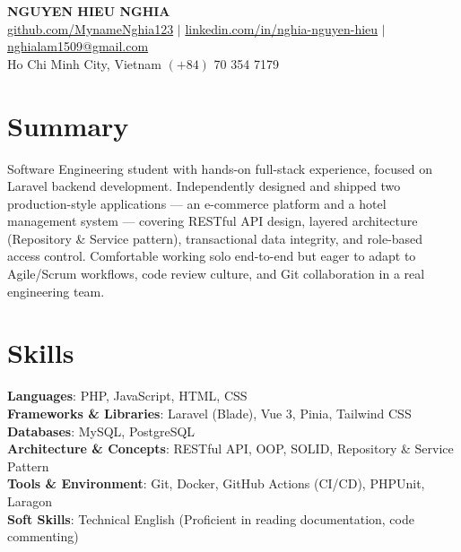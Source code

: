 \documentclass[letterpaper,10pt]{article}
\begin{document}
\begin{center}
    \textbf{\Huge \scshape NGUYEN HIEU NGHIA} \\ \vspace{4pt}
    \small 
    \href{https://github.com/MynameNghia123}{github.com/MynameNghia123} $|$ 
    \href{https://linkedin.com/in/nghia-nguyen-hieu}{linkedin.com/in/nghia-nguyen-hieu} $|$ 
    \href{mailto:nghialam1509@gmail.com}{nghialam1509@gmail.com} \\ \vspace{2pt}
    \small Ho Chi Minh City, Vietnam \quad $(+84)$ 70 354 7179
\end{center}

\section{Summary}
\small{
Software Engineering student with hands-on full-stack experience, focused on Laravel backend development. Independently designed and shipped two production-style applications --- an e-commerce platform and a hotel management system --- covering RESTful API design, layered architecture (Repository \& Service pattern), transactional data integrity, and role-based access control. Comfortable working solo end-to-end but eager to adapt to Agile/Scrum workflows, code review culture, and Git collaboration in a real engineering team.
}

\section{Skills}
\begin{itemize}[leftmargin=0.15in, label={}]
    \small{\item{
     \textbf{Languages}{: PHP, JavaScript, HTML, CSS} \\
     \textbf{Frameworks \& Libraries}{: Laravel (Blade), Vue 3, Pinia, Tailwind CSS} \\
     \textbf{Databases}{: MySQL, PostgreSQL} \\
     \textbf{Architecture \& Concepts}{: RESTful API, OOP, SOLID, Repository \& Service Pattern} \\
     \textbf{Tools \& Environment}{: Git, Docker, GitHub Actions (CI/CD), PHPUnit, Laragon} \\
     \textbf{Soft Skills}{: Technical English (Proficient in reading documentation, code commenting)}
    }}
\end{itemize}
\end{document}
